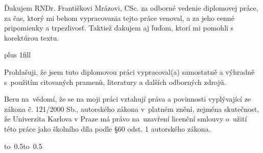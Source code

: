 \documentclass[12pt,a4paper]{report}
\let\openright=\clearpage
\theoremstyle{definition}
\begin{document}
\openright

\noindent
Ďakujem RNDr. Františkovi Mrázovi, CSc. za odborné vedenie diplomovej práce, za čas, ktorý mi behom vypracovania tejto práce venoval, a za jeho cenné pripomienky a trpezlivosť. Taktiež ďakujem aj ľuďom, ktorí mi pomohli s korektúrou textu.

\newpage


\vglue 0pt plus 1fill

\noindent
Prohlašuji, že jsem tuto diplomovou práci vypracoval(a) samostatně a výhradně
s~použitím citovaných pramenů, literatury a dalších odborných zdrojů.

\medskip\noindent
Beru na~vědomí, že se na moji práci vztahují práva a povinnosti vyplývající
ze zákona č. 121/2000 Sb., autorského zákona v~platném znění, zejména skutečnost,
že Univerzita Karlova v Praze má právo na~uzavření licenční smlouvy o~užití této
práce jako školního díla podle §60 odst. 1 autorského zákona.

\vspace{10mm}

\hbox{\hbox to 0.5\hbox to 0.5}

\vspace{20mm}
\newpage

\end{document}
